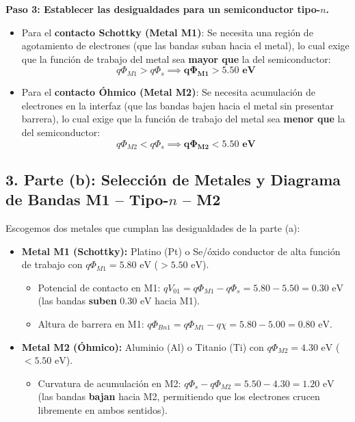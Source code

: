 \documentclass[11pt,a4paper]{article}
\begin{document}
\textbf{Paso 3: Establecer las desigualdades para un semiconductor tipo-$n$.}
\begin{itemize}
    \item Para el \textbf{contacto Schottky (Metal M1)}: Se necesita una región de agotamiento de electrones (que las bandas suban hacia el metal), lo cual exige que la función de trabajo del metal sea \textbf{mayor que} la del semiconductor:
    \[
    q\Phi_{M1} > q\Phi_s \implies \mathbf{q\Phi_{M1} > 5.50\text{ eV}}
    \]
    \item Para el \textbf{contacto Óhmico (Metal M2)}: Se necesita acumulación de electrones en la interfaz (que las bandas bajen hacia el metal sin presentar barrera), lo cual exige que la función de trabajo del metal sea \textbf{menor que} la del semiconductor:
    \[
    q\Phi_{M2} < q\Phi_s \implies \mathbf{q\Phi_{M2} < 5.50\text{ eV}}
    \]
\end{itemize}

\subsection*{3. Parte (b): Selección de Metales y Diagrama de Bandas M1 -- Tipo-$n$ -- M2}
Escogemos dos metales que cumplan las desigualdades de la parte (a):
\begin{itemize}
    \item \textbf{Metal M1 (Schottky):} Platino (Pt) o Se/óxido conductor de alta función de trabajo con $q\Phi_{M1} = 5.80\text{ eV}$ ($> 5.50\text{ eV}$).
    \begin{itemize}
        \item Potencial de contacto en M1: $qV_{01} = q\Phi_{M1} - q\Phi_s = 5.80 - 5.50 = 0.30\text{ eV}$ (las bandas \textbf{suben} $0.30\text{ eV}$ hacia M1).
        \item Altura de barrera en M1: $q\Phi_{Bn1} = q\Phi_{M1} - q\chi = 5.80 - 5.00 = 0.80\text{ eV}$.
    \end{itemize}
    \item \textbf{Metal M2 (Óhmico):} Aluminio (Al) o Titanio (Ti) con $q\Phi_{M2} = 4.30\text{ eV}$ ($< 5.50\text{ eV}$).
    \begin{itemize}
        \item Curvatura de acumulación en M2: $q\Phi_s - q\Phi_{M2} = 5.50 - 4.30 = 1.20\text{ eV}$ (las bandas \textbf{bajan} hacia M2, permitiendo que los electrones crucen libremente en ambos sentidos).
    \end{itemize}
\end{itemize}
\end{document}
